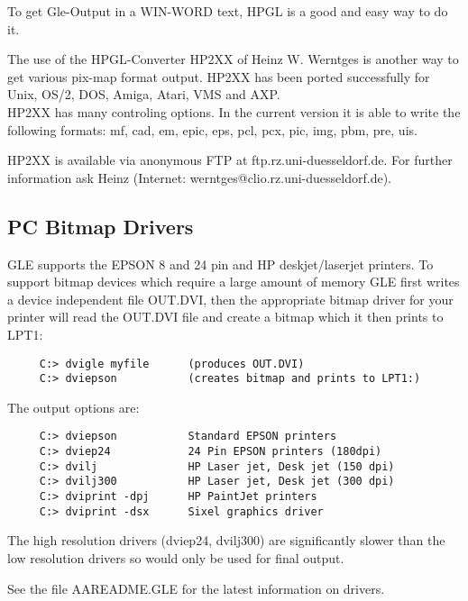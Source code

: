 To get Gle-Output in a WIN-WORD text, HPGL is a good and easy way to do it.
 

The use of the HPGL-Converter HP2XX of Heinz W. Werntges is another way to
get various pix-map format output. HP2XX has been ported successfully 
for Unix, OS/2, DOS, Amiga, Atari, VMS and AXP. \\ 
HP2XX has many controling options. In
the current version it is able to write the following formats: 
mf, cad, em, epic, eps, pcl, pcx, pic, img, pbm, pre, uis.

HP2XX is available via anonymous FTP at ftp.rz.uni-duesseldorf.de. For
further information ask Heinz (Internet:
werntges@clio.rz.uni-duesseldorf.de).
%

\subsection{PC Bitmap Drivers}
GLE supports the EPSON 8 and 24 pin and HP deskjet/laserjet printers.
To support bitmap devices which require a large amount of memory GLE 
first writes a device independent file OUT.DVI, then the
appropriate bitmap driver for your printer will read the OUT.DVI file
and create a bitmap which it then prints to LPT1:

\begin{verbatim}
     C:> dvigle myfile      (produces OUT.DVI)
     C:> dviepson           (creates bitmap and prints to LPT1:)
\end{verbatim}

The output options are:
\begin{verbatim}
     C:> dviepson           Standard EPSON printers 
     C:> dviep24            24 Pin EPSON printers (180dpi)
     C:> dvilj              HP Laser jet, Desk jet (150 dpi)
     C:> dvilj300           HP Laser jet, Desk jet (300 dpi)
     C:> dviprint -dpj      HP PaintJet printers
     C:> dviprint -dsx      Sixel graphics driver
\end{verbatim}
The high resolution drivers (dviep24, dvilj300) are significantly slower
than the low resolution drivers so would only be used for final output.

See the file AAREADME.GLE for the latest information on drivers.
\clearpage
